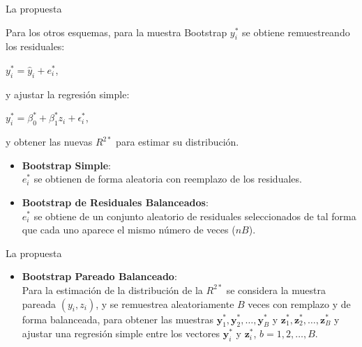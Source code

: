 \documentclass[serif, aspectratio=169]{beamer}
\begin{document}
\begin{frame}{La propuesta}
	
	Para los otros esquemas, para la muestra Bootstrap $y^{*}_{i}$ se obtiene remuestreando los residuales:
	
	\begin{center}
		{\large$ y^{*}_{i} = \hat{y}_{i} + e^{*}_{i}$},
	\end{center}
	
	y ajustar la regresión simple:
	\begin{center}
		$y^{*}_{i} = \beta_0^{*} + \beta_1^{*} z_i + \epsilon_i^{*} $,
	\end{center}
	
	y obtener las nuevas $R^{2*}$ para estimar su distribución.
	
	\begin{itemize}
		
		\item \textbf{Bootstrap Simple}:\\
		$e^{*}_{i}$ se obtienen de forma aleatoria con reemplazo de los residuales.
		
		\item \textbf{Bootstrap de Residuales Balanceados}:\\
		$e^{*}_{i}$ se obtiene de un conjunto aleatorio de residuales seleccionados de tal forma que cada uno aparece el mismo número de veces ($nB$).
		
	\end{itemize}
	
\end{frame}


\begin{frame}{La propuesta}
	
	\begin{itemize}
		\item \textbf{Bootstrap Pareado Balanceado}:\\
		
		Para la estimación de la distribución de la $R^{2*}$ se considera la muestra pareada $(y_i, z_i)$, y se remuestrea aleatoriamente $B$ veces con remplazo y de forma balanceada, para obtener las muestras \( \mathbf{y}_{1}^{*}, \mathbf{y}_{2}^{*}, \dots, \mathbf{y}_{B}^{*} \) y \( \mathbf{z}_{1}^{*}, \mathbf{z}_{2}^{*}, \dots, \mathbf{z}_{B}^{*} \) y ajustar una regresión simple entre los vectores \( \mathbf{y}^{*}_{i} \) y \( \mathbf{z}_{i}^{*} \), \( b = 1, 2, \dots, B \).
		
	
		
	\end{itemize}
	
\end{frame}
\end{document}
